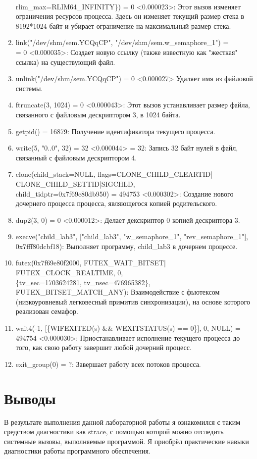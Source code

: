 \documentclass[a4paper, 12pt]{article}
\begin{document}
\begin{enumerate}
    \\rlim\_max=RLIM64\_INFINITY\}) = 0 <0.000023>: Этот вызов изменяет ограничения ресурсов процесса. Здесь он изменяет текущий размер стека в 8192*1024 байт и убирает ограничение на максимальный размер стека.
    \item link("/dev/shm/sem.YCQqCP", "/dev/shm/sem.w\_semaphore\_1") = \\ = 0 <0.000035>: Создает новую ссылку (также известную как "жесткая" ссылка) на существующий файл. 
    \item unlink("/dev/shm/sem.YCQqCP")           = 0 <0.000027> Удаляет имя из файловой системы.
    \item ftruncate(3, 1024) = 0 <0.000043>: Этот вызов устанавливает размер файла, связанного с файловым дескриптором 3, в 1024 байта.
    \item getpid() = 16879: Получение идентификатора текущего процесса.
    \item write(5, "0..0", 32) = 32 <0.000044>
    = 32: Запись 32 байт нулей в файл, связанный с файловым дескриптором 4.
    \item clone(child\_stack=NULL, flags=CLONE\_CHILD\_CLEARTID|\\CLONE\_CHILD\_SETTID|SIGCHLD, \\child\_tidptr=0x7f69e80db950) = 494753 <0.000302>: Создание нового дочернего процесса процесса, являющегося копией родительского.
    \item dup2(3, 0) = 0 <0.000012>: Делает декскриптор 0 копией дескриптора 3.
    \item execve("child\_lab3", ["child\_lab3", "w\_semaphore\_1", "rev\_semaphore\_1"], \\0x7fff80dcbf18): Выполняет программу, child\_lab3 в дочернем процессе.
    \item futex(0x7f69e80f2000, FUTEX\_WAIT\_BITSET|\\FUTEX\_CLOCK\_REALTIME, 0, \\\{tv\_sec=1703624281, tv\_nsec=476965382\}, \\FUTEX\_BITSET\_MATCH\_ANY): Взаимодействие с фьютексом (низкоуровневый легковесный примитив синхронизации), на основе которого реализован семафор.
    \item wait4(-1, [\{WIFEXITED(s) \&\& WEXITSTATUS(s) == 0\}], 0, NULL) = 494754 <0.000030>:  Приостанавливает исполнение текущего процесса до того, как свою работу завершит любой дочерний процесс. 
    \item exit\_group(0) = ?: Завершает работу всех потоков процесса.

\end{enumerate}

\newpage
\section{Выводы}

В результате выполнения данной лабораторной работы я ознакомился с таким средством диагностики как strace, с помощью которой можно отследить системные вызовы, выполняемые программой. Я приобрёл практические навыки диагностики работы программного обеспечения.
\end{document}
